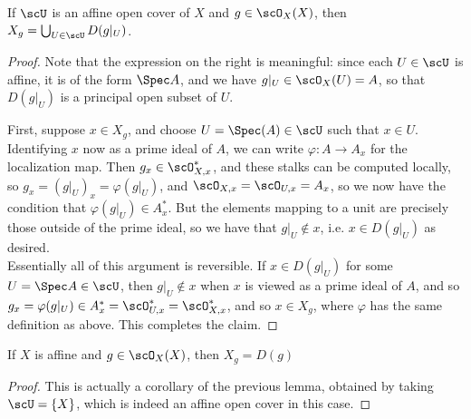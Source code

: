 \begin{lem}	If $\scU$ is an affine open cover of $X$ and $g \in \scO_X(X)$, then $X_g = \bigcup_{U \in \scU} D(g|_U)$. \end{lem}
\begin{proof}
	Note that the expression on the right is meaningful: since each $U \in \scU$ is affine, it is of the form $\Spec A$, and we have $g|_U \in \scO_X(U) = A$, so that $D(g|_U)$ is a principal open subset of $U$.
	
	First, suppose $x \in X_g$, and choose $U = \Spec(A) \in \scU$ such that $x \in U$. Identifying $x$ now as a prime ideal of $A$, we can write $\varphi : A \to A_x$ for the localization map. Then $g_x \in \scO_{X,x}^\ast$, and these stalks can be computed locally, so $g_x = (g|_U)_x = \varphi(g|_U)$, and $\scO_{X,x} = \scO_{U,x} = A_x$, so we now have the condition that $\varphi(g|_U) \in A_x^\ast$. But the elements mapping to a unit are precisely those outside of the prime ideal, so we have that $g|_U \notin x$, i.e. $x \in D(g|_U)$ as desired. \\
	
	Essentially all of this argument is reversible. If $x \in D(g|_U)$ for some $U = \Spec A \in \scU$, then $g|_U \notin x$ when $x$ is viewed as a prime ideal of $A$, and so $g_x = \varphi(g|_U) \in A_x^\ast = \scO_{U,x}^\ast = \scO_{X,x}^\ast$, and so $x \in X_g$, where $\varphi$ has the same definition as above. This completes the claim.
\end{proof}

\begin{lem} If $X$ is affine and $g \in \scO_X(X)$, then $X_g = D(g)$ \end{lem}
\begin{proof}
	This is actually a corollary of the previous lemma, obtained by taking $\scU = \{X\}$, which is indeed an affine open cover in this case.
\end{proof}

